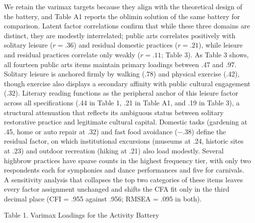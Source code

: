 \documentclass[
  12pt
]{article}
\begin{document}
We retain the varimax targets because they align with the theoretical design of the battery, and Table A1 reports the oblimin solution of the same battery for comparison. Latent factor correlations confirm that while these three domains are distinct, they are modestly interrelated; public arts correlates positively with solitary leisure ($r = .36$) and residual domestic practices ($r = .21$), while leisure and residual practices correlate only weakly ($r = .11$; Table 3). As Table 3 shows, all fourteen public arts items maintain primary loadings between .47 and .97. Solitary leisure is anchored firmly by walking (.78) and physical exercise (.42), though exercise also displays a secondary affinity with public cultural engagement (.32). Literary reading functions as the peripheral anchor of this leisure factor across all specifications (.44 in Table 1, .21 in Table A1, and .19 in Table 3), a structural attenuation that reflects its ambiguous status between solitary restorative practice and legitimate cultural capital. Domestic tasks (gardening at .45, home or auto repair at .32) and fast food avoidance ($-.38$) define the residual factor, on which institutional excursions (museums at .24, historic sites at .23) and outdoor recreation (hiking at .21) also load modestly. Several highbrow practices have sparse counts in the highest frequency tier, with only two respondents each for symphonies and dance performances and five for carnivals. A sensitivity analysis that collapses the top two categories of these items leaves every factor assignment unchanged and shifts the CFA fit only in the third decimal place (CFI = .955 against .956; RMSEA = .095 in both).


Table 1. Varimax Loadings for the Activity Battery
\end{document}

